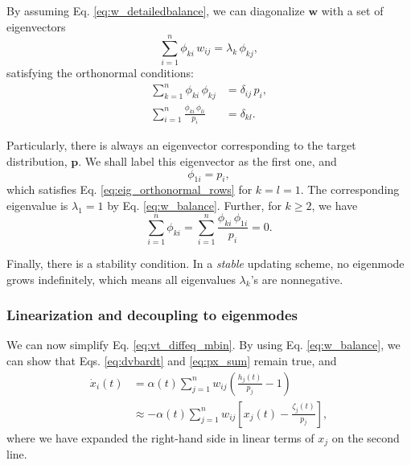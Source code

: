 \documentclass[reprint, floatfix]{revtex4-1}
\begin{document}
By assuming Eq. \eqref{eq:w_detailedbalance},
we can diagonalize $\mathbf w$ with a set of
eigenvectors
%
\begin{equation}
  \sum_{i = 1}^n \phi_{ki} \, w_{ij}
  =
  \lambda_k \, \phi_{kj}
  ,
\label{eq:eig_w}
\end{equation}
%
satisfying the orthonormal conditions\cite{vankampen}:
%
\begin{align}
  \sum_{k = 1}^n
    \phi_{ki} \, \phi_{kj}
  &=
  \delta_{ij} \, p_i,
  \label{eq:eig_orthonormal_cols}
  \\
  \sum_{i = 1}^n
    \frac{ \phi_{ki} \, \phi_{li} }
         { p_i }
  &=
  \delta_{kl}
  .
\label{eq:eig_orthonormal_rows}
\end{align}

Particularly, there is always an eigenvector
corresponding to the target distribution, $\mathbf p$.
%
We shall label this eigenvector as the first one,
and
%
\begin{equation}
  \phi_{1i} = p_i,
\label{eq:eigenmode1}
\end{equation}
%
which satisfies Eq. \eqref{eq:eig_orthonormal_rows}
for $k = l = 1$.
%
The corresponding eigenvalue is $\lambda_1 = 1$
by Eq. \eqref{eq:w_balance}.
%
Further, for $k \ge 2$, we have
%
\begin{equation}
  \sum_{ i = 1 }^n \phi_{ki}
  =
  \sum_{ i = 1 }^n
    \frac{ \phi_{ki} \, \phi_{1i} }
         { p_i }
  =
  0
  .
\label{eq:ortho1}
\end{equation}

Finally, there is a stability condition.
%
In a \emph{stable} updating scheme,
no eigenmode grows indefinitely,
which means all eigenvalues $\lambda_k$'s
are nonnegative.




\subsubsection{Linearization and decoupling to eigenmodes}



We can now simplify Eq. \eqref{eq:vt_diffeq_mbin}.
%
By using Eq. \eqref{eq:w_balance},
we can show that
Eqs. \eqref{eq:dvbardt} and \eqref{eq:px_sum}
remain true, and
%
$$
\begin{aligned}
  \dot x_i(t)
  &= \alpha(t) \sum_{j=1}^n w_{ij}
  \left( \frac{ h_j(t) } { p_j }  - 1 \right)
  \\
  &\approx
  -\alpha(t) \sum_{j = 1}^n
  w_{ij} \left[ x_j(t) - \frac{\zeta_j (t)}{p_j} \right],
\end{aligned}
$$
where
we have expanded the right-hand side
in linear terms of $x_j$
on the second line.
\end{document}
